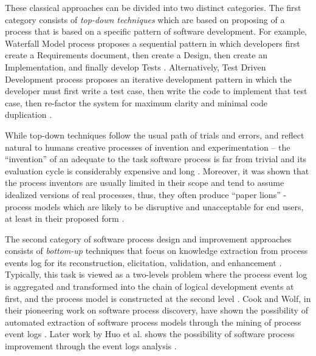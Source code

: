 These classical approaches can be divided into two distinct categories. 
The first category consists of \textit{top-down techniques} which are based on proposing of a process 
that is based on a specific pattern of software development. 
For example, Waterfall Model process proposes a sequential pattern in which developers first create a 
Requirements document, then create a Design, then create an Implementation, and finally develop Tests 
\cite{citeulike:9982731}. 
Alternatively,  Test Driven Development process proposes an iterative development pattern in which
the developer must first write a test case, then write the code to implement that test case, then re-factor 
the system for maximum clarity and minimal code duplication \cite{Beck_TDD}. 

While top-down techniques follow the usual path of trials and errors, and reflect natural to 
humans creative processes of invention and experimentation -- the ``invention'' of an adequate to 
the task software process is far from trivial and its evaluation cycle is considerably expensive 
and long \cite{citeulike:5043104} \cite{citeulike:1986013}.
Moreover, it was shown that the process inventors are usually limited in their scope and tend to 
assume idealized versions of real processes, thus, they often produce ``paper lions'' - process 
models which are likely to be disruptive and unacceptable for end users, 
at least in their proposed form \cite{citeulike:9758924}.

The second category of software process design and improvement approaches consists of 
\textit{bottom-up} techniques that focus on knowledge extraction from process events log for 
its reconstruction, elicitation, validation, and enhancement \cite{citeulike:12944447}. 
Typically, this task is viewed as a two-levels problem where the process event log is aggregated and 
transformed into the chain of logical development events at first, 
and the process model is constructed at the second level \cite{citeulike:2703162} \cite{citeulike:12944447}.
Cook and Wolf, in their pioneering work on software process discovery, have shown the possibility of 
automated extraction of software process models through the mining of process event logs 
\cite{citeulike:328044} \cite{citeulike:5120757} \cite{citeulike:5128143}. 
Later work by Huo et al. shows the possibility of software process improvement through the event 
logs analysis \cite{citeulike:7691059} \cite{citeulike:7690766}. 

